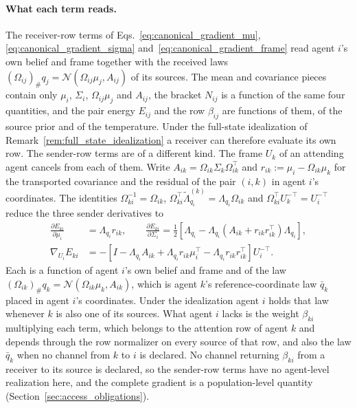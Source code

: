 \paragraph{What each term reads.}
The receiver-row terms of Eqs.~\eqref{eq:canonical_gradient_mu}, \eqref{eq:canonical_gradient_sigma} and~\eqref{eq:canonical_gradient_frame} read agent $i$'s own belief and frame together with the received laws $(\Omega_{ij})_\#q_j=\mathcal N(\Omega_{ij}\mu_j,A_{ij})$ of its sources. The mean and covariance pieces contain only $\mu_i$, $\Sigma_i$, $\Omega_{ij}\mu_j$ and $A_{ij}$, the bracket $N_{ij}$ is a function of the same four quantities, and the pair energy $E_{ij}$ and the row $\beta_{ij}$ are functions of them, of the source prior and of the temperature. Under the full-state idealization of Remark~\ref{rem:full_state_idealization} a receiver can therefore evaluate its own row. The sender-row terms are of a different kind. The frame $U_k$ of an attending agent cancels from each of them. Write $A_{ik}=\Omega_{ik}\Sigma_k\Omega_{ik}^\top$ and $r_{ik}:=\mu_i-\Omega_{ik}\mu_k$ for the transported covariance and the residual of the pair $(i,k)$ in agent $i$'s coordinates. The identities $\Omega_{ki}^{-1}=\Omega_{ik}$, $\Omega_{ki}^\top\tilde{\Lambda}_{q_i}^{(k)}=\Lambda_{q_i}\Omega_{ik}$ and $\Omega_{ki}^\top U_k^{-\top}=U_i^{-\top}$ reduce the three sender derivatives to
\begin{equation}
\begin{aligned}
\frac{\partial E_{ki}}{\partial \mu_i} &= \Lambda_{q_i}r_{ik},
\qquad
\frac{\partial E_{ki}}{\partial \Sigma_i} = \frac{1}{2}\left[\Lambda_{q_i} - \Lambda_{q_i}\left(A_{ik} + r_{ik}r_{ik}^\top\right)\Lambda_{q_i}\right], \\
\nabla_{U_i}E_{ki} &= -\left[I - \Lambda_{q_i}A_{ik} + \Lambda_{q_i}r_{ik}\mu_i^\top - \Lambda_{q_i}r_{ik}r_{ik}^\top\right]U_i^{-\top}.
\end{aligned}
\label{eq:sender_row_reduced}
\end{equation}
Each is a function of agent $i$'s own belief and frame and of the law $(\Omega_{ik})_\#q_k=\mathcal N(\Omega_{ik}\mu_k,A_{ik})$, which is agent $k$'s reference-coordinate law $\bar q_k$ placed in agent $i$'s coordinates. Under the idealization agent $i$ holds that law whenever $k$ is also one of its sources. What agent $i$ lacks is the weight $\beta_{ki}$ multiplying each term, which belongs to the attention row of agent $k$ and depends through the row normalizer on every source of that row, and also the law $\bar q_k$ when no channel from $k$ to $i$ is declared. No channel returning $\beta_{ki}$ from a receiver to its source is declared, so the sender-row terms have no agent-level realization here, and the complete gradient is a population-level quantity (Section~\ref{sec:access_obligations}).

